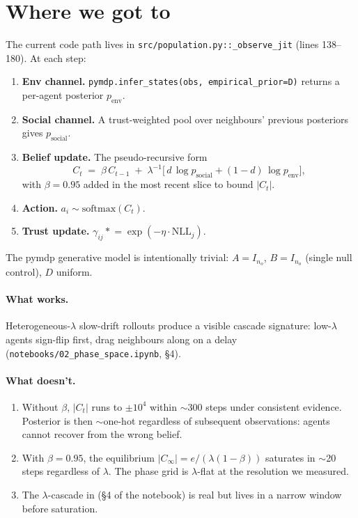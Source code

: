 \documentclass[11pt,a4paper]{article}
\newcommand{\code}[1]{\texttt{\small #1}}
\begin{document}
\section{Where we got to}
\label{sec:impl}

The current code path lives in \code{src/population.py::\_observe\_jit}
(lines 138--180). At each step:
\begin{enumerate}[topsep=2pt,itemsep=2pt]
\item \textbf{Env channel.} \code{pymdp.infer\_states(obs, empirical\_prior=D)}
  returns a per-agent posterior $p_{\text{env}}$.
\item \textbf{Social channel.} A trust-weighted pool over neighbours' previous
  posteriors gives $p_{\text{social}}$.
\item \textbf{Belief update.} The pseudo-recursive form
  \begin{equation}
  C_t \;=\; \beta\,C_{t-1} \;+\; \lambda^{-1}\bigl[\, d\,\log p_{\text{social}}
                                             + (1-d)\,\log p_{\text{env}} \bigr],
  \label{eq:current-update}
  \end{equation}
  with $\beta = 0.95$ added in the most recent slice to bound $|C_t|$.
\item \textbf{Action.} $a_i \sim \mathrm{softmax}(C_t)$.
\item \textbf{Trust update.} $\gamma_{ij} \mathrel{*}= \exp(-\eta \cdot \mathrm{NLL}_j)$.
\end{enumerate}

The pymdp generative model is intentionally trivial: $A = I_{n_o}$,
$B = I_{n_o}$ (single null control), $D$ uniform.

\paragraph{What works.} Heterogeneous-$\lambda$ slow-drift rollouts produce a
visible cascade signature: low-$\lambda$ agents sign-flip first, drag
neighbours along on a delay (\code{notebooks/02\_phase\_space.ipynb}, \S4).

\paragraph{What doesn't.}
\begin{enumerate}[topsep=2pt,itemsep=2pt]
\item Without $\beta$, $|C_t|$ runs to $\pm 10^4$ within $\sim$300 steps under
  consistent evidence. Posterior is then $\sim$one-hot regardless of
  subsequent observations: agents cannot recover from the wrong belief.
\item With $\beta = 0.95$, the equilibrium $|C_\infty| = e/(\lambda(1-\beta))$
  saturates in $\sim$20 steps regardless of $\lambda$. The phase grid is
  $\lambda$-flat at the resolution we measured.
\item The $\lambda$-cascade in (\S4 of the notebook) is real but lives in
  a narrow window before saturation.
\end{enumerate}
\end{document}

